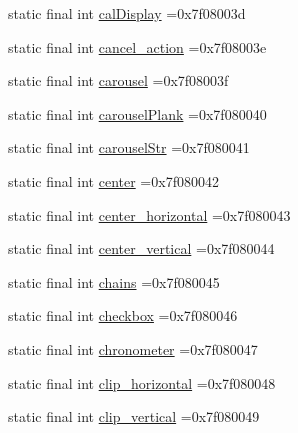 \begin{DoxyCompactItemize}
\item 
static final int \mbox{\hyperlink{classcom_1_1example_1_1trainawearapplication_1_1_r_1_1id_aeb331895d294b1721193defd5f0344d8}{cal\+Display}} =0x7f08003d
\item 
static final int \mbox{\hyperlink{classcom_1_1example_1_1trainawearapplication_1_1_r_1_1id_a7c55f0a4accd327dcc3f78ee690c9dc5}{cancel\+\_\+action}} =0x7f08003e
\item 
static final int \mbox{\hyperlink{classcom_1_1example_1_1trainawearapplication_1_1_r_1_1id_a0761ac4461bf35ea0d75ea178dec7d49}{carousel}} =0x7f08003f
\item 
static final int \mbox{\hyperlink{classcom_1_1example_1_1trainawearapplication_1_1_r_1_1id_a5dfa6c61870bf12d77b4d7ca07931f9d}{carousel\+Plank}} =0x7f080040
\item 
static final int \mbox{\hyperlink{classcom_1_1example_1_1trainawearapplication_1_1_r_1_1id_a99899edeb6422805421067d6edc67da6}{carousel\+Str}} =0x7f080041
\item 
static final int \mbox{\hyperlink{classcom_1_1example_1_1trainawearapplication_1_1_r_1_1id_abee89826dff8a33a293fab50ce416d93}{center}} =0x7f080042
\item 
static final int \mbox{\hyperlink{classcom_1_1example_1_1trainawearapplication_1_1_r_1_1id_a9ec59161b8e78f6ae1f463ef38839146}{center\+\_\+horizontal}} =0x7f080043
\item 
static final int \mbox{\hyperlink{classcom_1_1example_1_1trainawearapplication_1_1_r_1_1id_a1b60489f0f2986e0d5219a44e8ac7a3e}{center\+\_\+vertical}} =0x7f080044
\item 
static final int \mbox{\hyperlink{classcom_1_1example_1_1trainawearapplication_1_1_r_1_1id_a5fce88e20a2cff9ff41ca9d628006383}{chains}} =0x7f080045
\item 
static final int \mbox{\hyperlink{classcom_1_1example_1_1trainawearapplication_1_1_r_1_1id_a8006aeb1a7d75ca4a865c43cb2f1694d}{checkbox}} =0x7f080046
\item 
static final int \mbox{\hyperlink{classcom_1_1example_1_1trainawearapplication_1_1_r_1_1id_ac14c4f8e1b26d97336a2f94082b9b2c6}{chronometer}} =0x7f080047
\item 
static final int \mbox{\hyperlink{classcom_1_1example_1_1trainawearapplication_1_1_r_1_1id_ad1097e19d9bdc0901b8707fabcc09a92}{clip\+\_\+horizontal}} =0x7f080048
\item 
static final int \mbox{\hyperlink{classcom_1_1example_1_1trainawearapplication_1_1_r_1_1id_a685a7f4cbf3da7f350b1be0ed91d843b}{clip\+\_\+vertical}} =0x7f080049

\end{DoxyCompactItemize}
